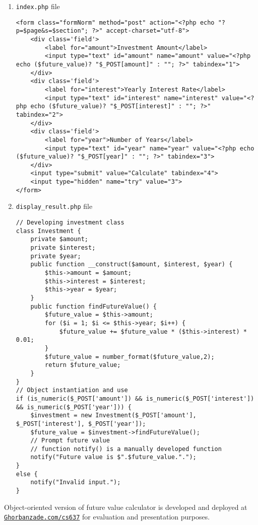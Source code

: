 \begin{enumerate}
\item \texttt{index.php} file
\lstset{language=php,tabsize=2}
\begin{lstlisting}
<form class="formNorm" method="post" action="<?php echo "?p=$page&s=$section"; ?>" accept-charset="utf-8">
	<div class='field'>
		<label for="amount">Investment Amount</label>
		<input type="text" id="amount" name="amount" value="<?php echo ($future_value)? "$_POST[amount]" : ""; ?>" tabindex="1">
	</div>
	<div class='field'>
		<label for="interest">Yearly Interest Rate</label>
		<input type="text" id="interest" name="interest" value="<?php echo ($future_value)? "$_POST[interest]" : ""; ?>" tabindex="2">
	</div>
	<div class='field'>
		<label for="year">Number of Years</label>
		<input type="text" id="year" name="year" value="<?php echo ($future_value)? "$_POST[year]" : ""; ?>" tabindex="3">
	</div>
	<input type="submit" value="Calculate" tabindex="4">
	<input type="hidden" name="try" value="3">
</form>
\end{lstlisting}

\item \texttt{display\_result.php} file
\lstset{language=php,tabsize=2}
\begin{lstlisting}
// Developing investment class
class Investment {
	private $amount;
	private $interest;
	private $year;
	public function __construct($amount, $interest, $year) {
		$this->amount = $amount;
		$this->interest = $interest;
		$this->year = $year;
	}
	public function findFutureValue() {
		$future_value = $this->amount;
		for ($i = 1; $i <= $this->year; $i++) {
			$future_value += $future_value * ($this->interest) * 0.01;
		}
		$future_value = number_format($future_value,2);
		return $future_value;
	}
}
// Object instantiation and use
if (is_numeric($_POST['amount']) && is_numeric($_POST['interest']) && is_numeric($_POST['year'])) {
	$investment = new Investment($_POST['amount'], $_POST['interest'], $_POST['year']);
	$future_value = $investment->findFutureValue();
	// Prompt future value
	// function notify() is a manually developed function
	notify("Future value is $".$future_value.".");
}
else {
	notify("Invalid input.");
}
\end{lstlisting}
\end{enumerate}

Object-oriented version of future value calculator is developed and deployed at \href{http://ghorbanzade.com/cs637}{\tt Ghorbanzade.com/cs637} for evaluation and presentation purposes.

